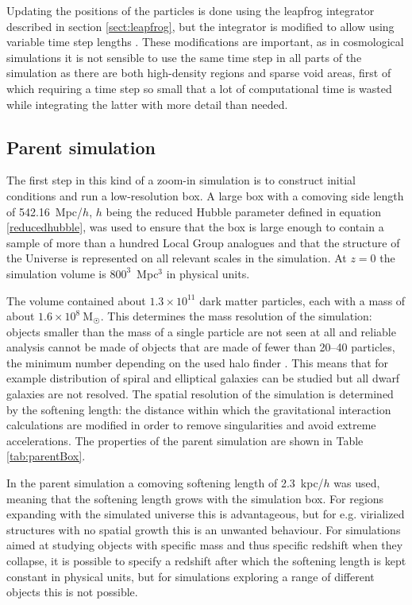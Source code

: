 \documentclass[english, twoside]{HYgradu}
\begin{document}
Updating the positions of the particles is done using the leapfrog integrator described in section \ref{sect:leapfrog}, but the integrator is modified to allow using variable time step lengths \citep{springel2005cosmological}. These modifications are important, as in cosmological simulations it is not sensible to use the same time step in all parts of the simulation as there are both high-density regions and sparse void areas, first of which requiring a time step so small that a lot of computational time is wasted while integrating the latter with more detail than needed.

\subsection{Parent simulation}
The first step in this kind of a zoom-in simulation is to construct initial conditions and run a low-resolution box. A large box with a comoving side length of 542.16~Mpc/$h$, $h$ being the reduced Hubble parameter defined in equation \ref{reducedhubble}, was used to ensure that the box is large enough to contain a sample of more than a hundred Local Group analogues and that the structure of the Universe is represented on all relevant scales in the simulation. At $z = 0$ the simulation volume is $800^3$~Mpc$^3$ in physical units.

The volume contained about $1.3 \times 10^{11}$ dark matter particles, each with a mass of about $1.6 \times 10^8~\mathrm{M_{\astrosun}}$. This determines the mass resolution of the simulation: objects smaller than the mass of a single particle are not seen at all and reliable analysis cannot be made of objects that are made of fewer than 20--40 particles, the minimum number depending on the used halo finder \citep{knebe2011haloes}. This means that for example distribution of spiral and elliptical galaxies can be studied but all dwarf galaxies are not resolved. The spatial resolution of the simulation is determined by the softening length: the distance within which the gravitational interaction calculations are modified in order to remove singularities and avoid extreme accelerations. The properties of the parent simulation are shown in Table \ref{tab:parentBox}.

In the parent simulation a comoving softening length of 2.3~kpc/$h$ was used, meaning that the softening length grows with the simulation box. For regions expanding with the simulated universe this is advantageous, but for e.g. virialized structures with no spatial growth this is an unwanted behaviour. For simulations aimed at studying objects with specific mass and thus specific redshift when they collapse, it is possible to specify a redshift after which the softening length is kept constant in physical units, but for simulations exploring a range of different objects this is not possible.
\end{document}
